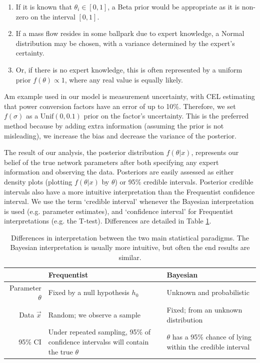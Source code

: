 \documentclass[a4paper, 12pt]{article}
\begin{document}
\begin{enumerate}
\item If it is known that $\theta_i \in [0,1]$, a Beta prior would be appropriate as it is non-zero on the interval $[0, 1]$. 
\item If a mass flow resides in some ballpark due to expert knowledge, a Normal distribution may be chosen, with a variance determined by the expert's certainty.
\item Or, if there is no expert knowledge, this is often represented by a uniform prior $f(\theta)\propto 1$, where any real value is equally likely.
\end{enumerate}

Am example used in our model is measurement uncertainty, with CEL estimating that power conversion factors have an error of up to 10\%. Therefore, we set $f(\sigma)$ as a $\text{Unif}(0,0.1)$ prior on the factor's uncertainty. This is the preferred method because by adding extra information (assuming the prior is not misleading), we increase the bias and decrease the variance of the posterior.

The result of our analysis, the posterior distribution $f(\theta|x)$, represents our belief of the true network parameters after both specifying any expert information and observing the data. Posteriors are easily assessed as either density plots (plotting $f(\theta|x)$ by $\theta$) or 95\% credible intervals. Posterior credible intervals also have a more intuitive interpretation than the Frequentist confidence interval. We use the term `credible interval' whenever the Bayesian interpretation is used (e.g. parameter estimates), and `confidence interval' for Frequentist interpretations (e.g. the T-test). Differences are detailed in Table \ref{tab:ci}.

\begin{table}
\centering
\begin{tabularx}{0.85\linewidth}{rXX}
\hline
 & Frequentist & Bayesian \\ 
  \hline
Parameter $\theta$ & Fixed by a null hypothesis $h_0$ & Unknown and probabilistic \\\hline
Data $\vec{x}$ & Random; we observe a sample & Fixed; from an unknown distribution \\\hline
95\% CI & Under repeated sampling, 95\% of confidence intervalss will contain the true $\theta$ & $\theta$ has a 95\% chance of lying within the credible interval  \\
   \hline
\end{tabularx}
\caption{Differences in interpretation between the two main statistical paradigms. The Bayesian interpretation is usually more intuitive, but often the end results are similar.}
\label{tab:ci}
\end{table}
\end{document}
